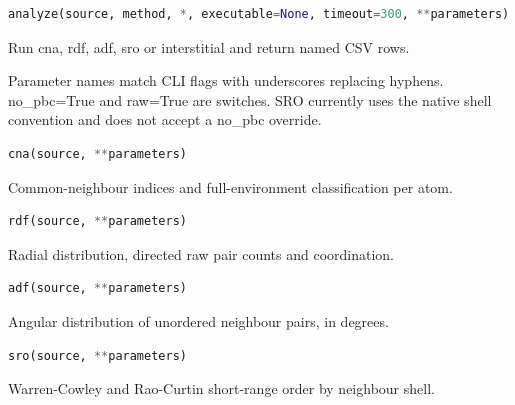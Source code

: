 \begin{samepage}

\begin{lstlisting}[language=Python]
analyze(source, method, *, executable=None, timeout=300, **parameters)
\end{lstlisting}

Run cna, rdf, adf, sro or interstitial and return named CSV rows.

Parameter names match CLI flags with underscores replacing hyphens.
no\_\allowbreak{}pbc=True and raw=True are switches. SRO currently uses the
native shell convention and does not accept a no\_\allowbreak{}pbc override.

\end{samepage}



\begin{samepage}

\begin{lstlisting}[language=Python]
cna(source, **parameters)
\end{lstlisting}

Common-neighbour indices and full-environment classification per atom.

\end{samepage}



\begin{samepage}

\begin{lstlisting}[language=Python]
rdf(source, **parameters)
\end{lstlisting}

Radial distribution, directed raw pair counts and coordination.

\end{samepage}



\begin{samepage}

\begin{lstlisting}[language=Python]
adf(source, **parameters)
\end{lstlisting}

Angular distribution of unordered neighbour pairs, in degrees.

\end{samepage}



\begin{samepage}

\begin{lstlisting}[language=Python]
sro(source, **parameters)
\end{lstlisting}

Warren-Cowley and Rao-Curtin short-range order by neighbour shell.

\end{samepage}



